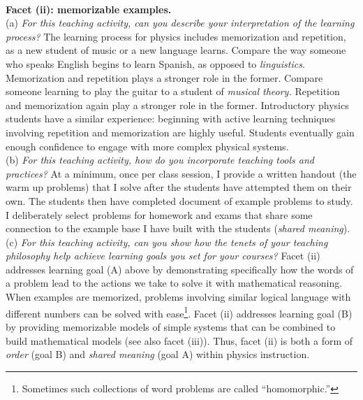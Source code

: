\documentclass[../../../main.tex]{subfiles}
\begin{document}
\\
\vspace{0.25cm}
\textbf{Facet (ii): memorizable examples.}
\\
\vspace{0.25cm}
(a) \textit{For this teaching activity, can you describe your interpretation of the learning process?}  The learning process for physics includes memorization and repetition, as a new student of music or a new language learns.  Compare the way someone who speaks English begins to learn Spanish, as opposed to \textit{linguistics}.  Memorization and repetition plays a stronger role in the former.  Compare someone learning to play the guitar to a student of \textit{musical theory.}  Repetition and memorization again play a stronger role in the former.  Introductory physics students have a similar experience: beginning with active learning techniques involving repetition and memorization are highly useful.  Students eventually gain enough confidence to engage with more complex physical systems.
\\
\vspace{0.25cm}
(b) \textit{For this teaching activity, how do you incorporate teaching tools and practices?}  At a minimum, once per class session, I provide a written handout (the warm up problems) that I solve after the students have attempted them on their own.  The students then have completed document of example problems to study.  I deliberately select problems for homework and exams that share some connection to the example base I have built with the students (\textit{shared meaning}).
\\
\vspace{0.25cm}
(c) \textit{For this teaching activity, can you show how the tenets of your teaching philosophy help achieve learning goals you set for your courses?}  Facet (ii) addresses learning goal (A) above by demonstrating specifically how the words of a problem lead to the actions we take to solve it with mathematical reasoning.  When examples are memorized, problems involving similar logical language with different numbers can be solved with ease\footnote{Sometimes such collections of word problems are called ``homomorphic.''}.  Facet (ii) addresses learning goal (B) by providing memorizable models of simple systems that can be combined to build mathematical models (see also facet (iii)).  Thus, facet (ii) is both a form of \textit{order} (goal B) and \textit{shared meaning} (goal A) within physics instruction.
\\
\vspace{0.25cm}
\end{document}
